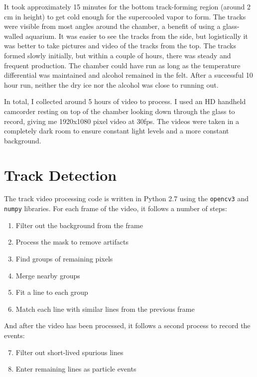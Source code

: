 \documentclass[notitlepage,12pt]{article}
\begin{document}
It took approximately 15 minutes for the bottom track-forming region (around 2 cm in height) to get cold enough for the supercooled vapor to form.  The tracks were visible from most angles around the chamber, a benefit of using a glass-walled aquarium. It was easier to see the tracks from the side, but logistically it was better to take pictures and video of the tracks from the top. The tracks formed slowly initially, but within a couple of hours, there was steady and frequent production. The chamber could have run as long as the temperature differential was maintained and alcohol remained in the felt.  After a successful 10 hour run, neither the dry ice nor the alcohol was close to running out.

In total, I collected around 5 hours of video to process.  I used an HD handheld camcorder resting on top of the chamber looking down through the glass to record, giving me 1920x1080 pixel video at 30fps.  The videos were taken in a completely dark room to ensure constant light levels and a more constant background.  

\section{Track Detection}

The track video processing code is written in Python 2.7 using the \texttt{opencv3} and \texttt{numpy} libraries.  For each frame of the video, it follows a number of steps:
\begin{enumerate}
	\item Filter out the background from the frame
	\item Process the mask to remove artifacts
	\item Find groups of remaining pixels
	\item Merge nearby groups
	\item Fit a line to each group
	\item Match each line with similar lines from the previous frame
\end{enumerate}

And after the video has been processed, it follows a second process to record the events:
\begin{enumerate}
	\setcounter{enumi}{6}
	\item Filter out short-lived spurious lines
	\item Enter remaining lines as particle events
\end{enumerate}
\end{document}

